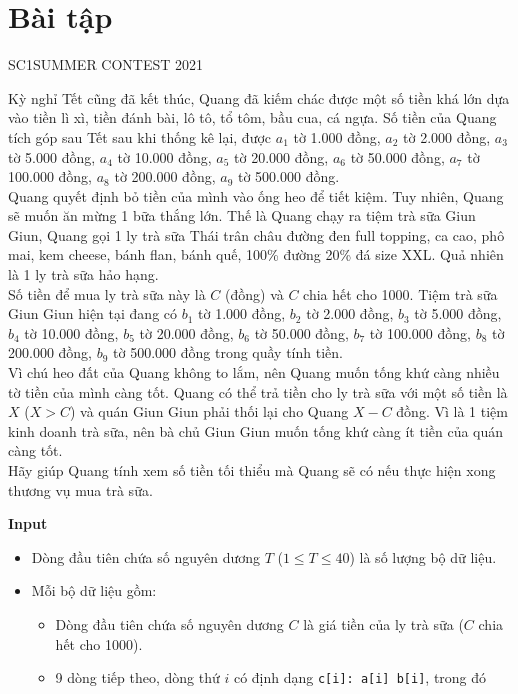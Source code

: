 \section{Bài tập}

\begin{baitap}{SC1}{SUMMER CONTEST 2021}

Kỳ nghỉ Tết cũng đã kết thúc, Quang đã kiếm chác được một số tiền khá lớn dựa vào tiền lì xì,
tiền đánh bài, lô tô, tổ tôm, bầu cua, cá ngựa. Số tiền của Quang tích góp sau Tết sau khi thống
kê lại, được $a_1$ tờ 1.000 đồng, $a_2$ tờ 2.000 đồng, $a_3$ tờ 5.000 đồng, $a_4$ tờ 10.000 đồng, 
$a_5$ tờ 20.000 đồng, $a_6$ tờ 50.000 đồng, $a_7$ tờ 100.000 đồng, $a_8$ tờ 200.000 đồng, 
$a_9$ tờ 500.000 đồng. \\

Quang quyết định bỏ tiền của mình vào ống heo để tiết kiệm. Tuy nhiên, Quang sẽ muốn ăn
mừng 1 bữa thắng lớn. Thế là Quang chạy ra tiệm trà sữa Giun Giun, Quang gọi 1 ly trà sữa Thái
trân châu đường đen full topping, ca cao, phô mai, kem cheese, bánh flan, bánh quế, 100\%
đường 20\% đá size XXL. Quả nhiên là 1 ly trà sữa hảo hạng.\\

Số tiền để mua ly trà sữa này là $C$ (đồng) và $C$ chia hết cho 1000. Tiệm trà sữa Giun Giun hiện tại
đang có $b_1$ tờ 1.000 đồng, $b_2$ tờ 2.000 đồng, $b_3$ tờ 5.000 đồng, $b_4$ tờ 10.000 đồng, 
$b_5$ tờ 20.000 đồng, $b_6$ tờ 50.000 đồng, $b_7$ tờ 100.000 đồng, $b_8$ tờ 200.000 đồng, 
$b_9$ tờ 500.000 đồng trong quầy tính tiền. \\

Vì chú heo đất của Quang không to lắm, nên Quang muốn tống khứ càng nhiều tờ
tiền của mình càng tốt. Quang có thể trả tiền cho ly trà sữa với một số tiền là $X$ ($X > C$) 
và quán Giun Giun phải thối lại cho Quang $X - C$ đồng. Vì là 1 tiệm kinh doanh trà sữa, 
nên bà chủ Giun Giun muốn tống khứ càng ít tiền của quán càng tốt. \\

Hãy giúp Quang tính xem số tiền tối thiểu mà Quang sẽ có nếu thực
hiện xong thương vụ mua trà sữa.

\textbf{Input}  
\begin{itemize}[noitemsep]
  \item Dòng đầu tiên chứa số nguyên dương $T$ ($1 \leq T \leq 40$) là số lượng bộ dữ liệu.
  \item Mỗi bộ dữ liệu gồm:
  \begin{itemize}
    \item Dòng đầu tiên chứa số nguyên dương $C$ là giá tiền của ly trà sữa ($C$ chia hết cho 1000).
    \item 9 dòng tiếp theo, dòng thứ $i$ có định dạng \texttt{c[i]: a[i] b[i]}, trong đó 
    

\end{itemize}
\end{itemize}
\end{baitap}
